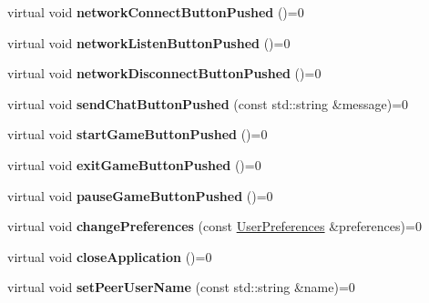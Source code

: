 \begin{DoxyCompactItemize}
\item 
\hypertarget{classUserInterface_a1b12a2289689bd1d907c87421b78bfb3}{
virtual void {\bfseries networkConnectButtonPushed} ()=0}
\label{classUserInterface_a1b12a2289689bd1d907c87421b78bfb3}

\item 
\hypertarget{classUserInterface_a0bcb21302e8bad1fab6864e688f90600}{
virtual void {\bfseries networkListenButtonPushed} ()=0}
\label{classUserInterface_a0bcb21302e8bad1fab6864e688f90600}

\item 
\hypertarget{classUserInterface_a5b58c16329d4c76efdc2e27b7a3ad3f6}{
virtual void {\bfseries networkDisconnectButtonPushed} ()=0}
\label{classUserInterface_a5b58c16329d4c76efdc2e27b7a3ad3f6}

\item 
\hypertarget{classUserInterface_a9016f77640f4197afee05e7e3368f951}{
virtual void {\bfseries sendChatButtonPushed} (const std::string \&message)=0}
\label{classUserInterface_a9016f77640f4197afee05e7e3368f951}

\item 
\hypertarget{classUserInterface_ae6b475f54fc90a950718312ab1c5ac6e}{
virtual void {\bfseries startGameButtonPushed} ()=0}
\label{classUserInterface_ae6b475f54fc90a950718312ab1c5ac6e}

\item 
\hypertarget{classUserInterface_acff5ed6d4703ee489e00eab5463e7227}{
virtual void {\bfseries exitGameButtonPushed} ()=0}
\label{classUserInterface_acff5ed6d4703ee489e00eab5463e7227}

\item 
\hypertarget{classUserInterface_aee390b73f66a0ed6f8511bf5eff7edb1}{
virtual void {\bfseries pauseGameButtonPushed} ()=0}
\label{classUserInterface_aee390b73f66a0ed6f8511bf5eff7edb1}

\item 
\hypertarget{classUserInterface_a9cd95da39bf37d49427d8f5b0b8eb862}{
virtual void {\bfseries changePreferences} (const \hyperlink{structUserPreferences}{UserPreferences} \&preferences)=0}
\label{classUserInterface_a9cd95da39bf37d49427d8f5b0b8eb862}

\item 
\hypertarget{classUserInterface_a00fb412f6a4ac0da2ca57053ad6d1515}{
virtual void {\bfseries closeApplication} ()=0}
\label{classUserInterface_a00fb412f6a4ac0da2ca57053ad6d1515}

\item 
\hypertarget{classUserInterface_a4b8e1fe5649f204600bf356a5b356e10}{
virtual void {\bfseries setPeerUserName} (const std::string \&name)=0}
\label{classUserInterface_a4b8e1fe5649f204600bf356a5b356e10}


\end{DoxyCompactItemize}
